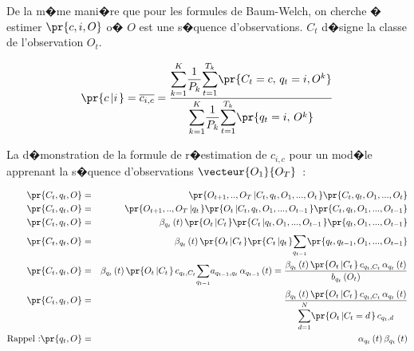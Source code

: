 \label{hmm_reestimation_emission_rn}%
%

De la m�me mani�re que pour les formules de Baum-Welch, on cherche � estimer $\pr{  c,i,O}  $ o� $O$ est une s�quence
d'observations. $C_{t}$ d�signe la classe de l'observation $O_{t}$.%

        $$
        \pr{  c\left|  i\right.  }  =\overline{c_{i,c}}=\dfrac{\underset {k=1}{\overset{K}
                { {\displaystyle\sum} }}\dfrac{1}{P_{k}}
        \underset{t=1}{\overset{T_{k}}{ {\displaystyle\sum}}} \pr{   C_{t}=c, \, q_{t}=i,O^{k}}  }
                {\underset{k=1}{\overset{K}{ {\displaystyle\sum}
        }}\dfrac{1}{P_{k}}\underset{t=1}{\overset{T_{k}}{ {\displaystyle\sum}}} \pr{  q_{t}=i, \, O^{k}}  }
        $$

La d�monstration de la formule de r�estimation de $c_{i,c}$ pour un mod�le apprenant la s�quence d'observations $\vecteur{O_1}{O_T}$~:

        \begin{eqnarray}
        \pr{  C_{t},q_{t},O }  &=&  \pr{  O_{t+1},..,O_{T}\left| 
                 C_{t},q_{t},O_{1},...,O_{t}\right.  } \pr{    C_{t},q_{t},O_{1}
            ,...,O_{t}} \nonumber\\
        \pr{   C_{t},q_{t},O}  &=& \pr{  O_{t+1},..,O_{T}\left|q_{t}\right.  }
                    \pr{  O_{t}\left|  C_{t},q_{t},O_{1},...,O_{t-1}
            \right. }  \pr{  C_{t},q_{t},O_{1},...,O_{t-1}} \nonumber\\
        \pr{  C_{t},q_{t},O}  &=& \beta_{q_{t}}\left(  t\right)  \pr{O_{t}\left|  C_{t}\right.  }
                 \pr{  C_{t}\left|  q_{t},O_{1}
            ,...,O_{t-1}\right.  }  \pr{ q_{t},O_{1},...,O_{t-1}} \nonumber\\
        \pr{  C_{t},q_{t},O}  &=& \beta_{q_{t}}\left(  t\right)  \pr{ O_{t}\left|  C_{t}\right. }
                  \pr{  C_{t}\left|  q_{t}\right.
            }  \underset{q_{t-1}}{\overset{}{\sum}} \pr{ q_{t},q_{t-1} ,O_{1},...,O_{t-1}} \nonumber\\
        \pr{  C_{t},q_{t},O}  &=& \beta_{q_{t}}\left(  t\right)  \pr{ O_{t}\left|  C_{t}\right.  }
                 \,c_{q_{t},C_{t}}\underset{q_{t-1}
            }{\overset{}{\sum}}a_{q_{t-1},q_{t}}\,\alpha_{q_{t-1}}\left(  t\right) =\dfrac{\beta_{q_{t}}\left(  t\right)
                      \pr{ O_{t}\left|  C_{t}\right.
            }  \,c_{q_{t},C_{t}}\,\alpha_{q_{t}}\left(  t\right)  }{b_{q_{t}}\left( O_{t}\right)  } \nonumber\\
        \pr{  C_{t},q_{t},O}  &=& \dfrac{\beta_{q_{t}}\left(  t\right) \pr{  O_{t}\left|  C_{t}\right.
                 }\,c_{q_{t},C_{t}} \,
            \alpha_{q_{t}} \left(  t\right)  }{\underset{d=1}{\overset{N}{{\displaystyle\sum}}}
                    \pr{  O_{t}\left|  C_{t}=d\right.}
            \,c_{q_{t},d}} \label{hmm_equation_reestimation}\\
        \text{Rappel :} \pr{  q_{t},O}  &=& \alpha_{q_{t}}\left(  t\right)  \beta_{q_{t} }\left(  t\right) \nonumber
        \end{eqnarray}

